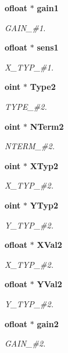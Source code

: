 \begin{CompactItemize}
{\bf ofloat} $\ast$ {\bf gain1}
\begin{CompactList}\small\item\em GAIN\_\-\#1. \item\end{CompactList}\item 
{\bf ofloat} $\ast$ {\bf sens1}
\begin{CompactList}\small\item\em X\_\-TYP\_\-\#1. \item\end{CompactList}\item 
{\bf oint} $\ast$ {\bf Type2}
\begin{CompactList}\small\item\em TYPE\_\-\#2. \item\end{CompactList}\item 
{\bf oint} $\ast$ {\bf NTerm2}
\begin{CompactList}\small\item\em NTERM\_\-\#2. \item\end{CompactList}\item 
{\bf oint} $\ast$ {\bf XTyp2}
\begin{CompactList}\small\item\em X\_\-TYP\_\-\#2. \item\end{CompactList}\item 
{\bf oint} $\ast$ {\bf YTyp2}
\begin{CompactList}\small\item\em Y\_\-TYP\_\-\#2. \item\end{CompactList}\item 
{\bf ofloat} $\ast$ {\bf XVal2}
\begin{CompactList}\small\item\em X\_\-TYP\_\-\#2. \item\end{CompactList}\item 
{\bf ofloat} $\ast$ {\bf YVal2}
\begin{CompactList}\small\item\em Y\_\-TYP\_\-\#2. \item\end{CompactList}\item 
{\bf ofloat} $\ast$ {\bf gain2}
\begin{CompactList}\small\item\em GAIN\_\-\#2. \item\end{CompactList}\item 

\end{CompactItemize}
